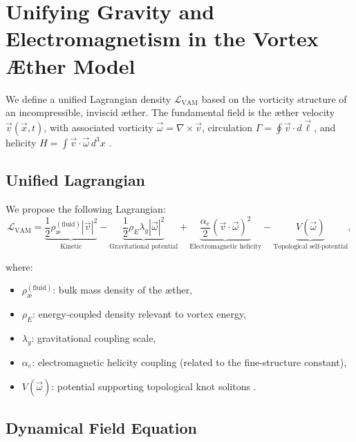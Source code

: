 \documentclass[preprint]{revtex4-2}
\begin{document}
\section{Unifying Gravity and Electromagnetism in the Vortex \AE ther Model}

We define a unified Lagrangian density \( \mathcal{L}_\text{VAM} \) based on the vorticity structure of an incompressible, inviscid æther. The fundamental field is the æther velocity \( \vec{v}(\vec{x}, t) \), with associated vorticity \( \vec{\omega} = \nabla \times \vec{v} \), circulation \( \Gamma = \oint \vec{v} \cdot d\vec{\ell} \), and helicity \( H = \int \vec{v} \cdot \vec{\omega} \, d^3x \) \cite{moffatt1969degree, arnold1998topological}.

\subsection*{Unified Lagrangian}

We propose the following Lagrangian:
\begin{equation}
\label{eq:L_VAM}
\mathcal{L}_\text{VAM} =
\underbrace{\frac{1}{2} \rho_\text{\ae}^{(\text{fluid})} |\vec{v}|^2}_{\text{Kinetic}} -
\underbrace{\frac{1}{2} \rho_{\scriptscriptstyle\boldsymbol\!E}\lambda_g |\vec{\omega}|^2}_{\text{Gravitational potential}} +
\underbrace{\frac{\alpha_e}{2} (\vec{v} \cdot \vec{\omega})^2}_{\text{Electromagnetic helicity}} -
\underbrace{V(\vec{\omega})}_{\text{Topological self-potential}},
\end{equation}

where:
\begin{itemize}
    \item \( \rho_\text{\ae}^{(\text{fluid})} \): bulk mass density of the æther,
    \item \( \rho_{\scriptscriptstyle\boldsymbol\!E}\): energy-coupled density relevant to vortex energy,
    \item \( \lambda_g \): gravitational coupling scale,
    \item \( \alpha_e \): electromagnetic helicity coupling (related to the fine-structure constant),
    \item \( V(\vec{\omega}) \): potential supporting topological knot solitons \cite{faddeev1997stable, babaev2002knotted}.
\end{itemize}

\subsection*{Dynamical Field Equation}
\end{document}
